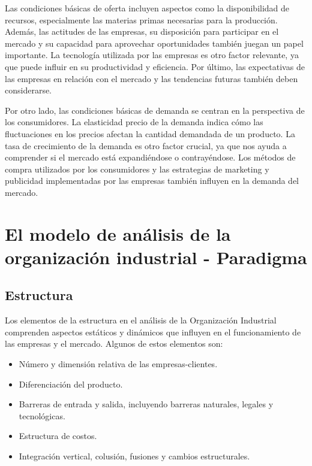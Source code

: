 \documentclass[
  doc,
  floatsintext,
  longtable,
  a4paper,
  nolmodern,
  notxfonts,
  notimes,
  12pt,
  colorlinks=true,linkcolor=blue,citecolor=blue,urlcolor=blue]{apa7}
\providecommand{\tightlist}{%
  \setlength{\itemsep}{0pt}\setlength{\parskip}{0pt}}
\begin{document}
Las condiciones básicas de oferta incluyen aspectos como la
disponibilidad de recursos, especialmente las materias primas necesarias
para la producción. Además, las actitudes de las empresas, su
disposición para participar en el mercado y su capacidad para aprovechar
oportunidades también juegan un papel importante. La tecnología
utilizada por las empresas es otro factor relevante, ya que puede
influir en su productividad y eficiencia. Por último, las expectativas
de las empresas en relación con el mercado y las tendencias futuras
también deben considerarse.

Por otro lado, las condiciones básicas de demanda se centran en la
perspectiva de los consumidores. La elasticidad precio de la demanda
indica cómo las fluctuaciones en los precios afectan la cantidad
demandada de un producto. La tasa de crecimiento de la demanda es otro
factor crucial, ya que nos ayuda a comprender si el mercado está
expandiéndose o contrayéndose. Los métodos de compra utilizados por los
consumidores y las estrategias de marketing y publicidad implementadas
por las empresas también influyen en la demanda del mercado.

\section{El modelo de análisis de la organización industrial -
Paradigma}\label{el-modelo-de-anuxe1lisis-de-la-organizaciuxf3n-industrial---paradigma}

\subsection{Estructura}\label{estructura}

Los elementos de la estructura en el análisis de la Organización
Industrial comprenden aspectos estáticos y dinámicos que influyen en el
funcionamiento de las empresas y el mercado. Algunos de estos elementos
son:

\begin{itemize}
\tightlist
\item
  Número y dimensión relativa de las empresas-clientes.
\item
  Diferenciación del producto.
\item
  Barreras de entrada y salida, incluyendo barreras naturales, legales y
  tecnológicas.
\item
  Estructura de costos.
\item
  Integración vertical, colusión, fusiones y cambios estructurales.
\end{itemize}
\end{document}
